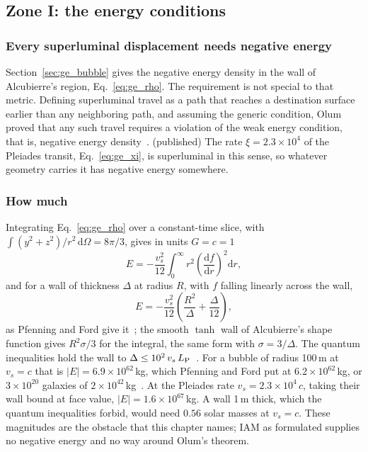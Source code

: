 \subsection{Zone I: the energy conditions}\label{sec:pr_energy}

\subsubsection{Every superluminal displacement needs negative energy}
Section~\ref{sec:ge_bubble} gives the negative energy density in the wall of Alcubierre's region, Eq.~\eqref{eq:ge_rho}. The requirement is not
special to that metric. Defining superluminal travel as a path that reaches a destination surface earlier than any neighboring path, and assuming
the generic condition, Olum proved that any such travel requires a violation of the weak energy condition, that is, negative energy
density~\cite{Olum1998}. \derived{} (published) The rate $\xi=2.3\times10^4$ of the Pleiades transit, Eq.~\eqref{eq:ge_xi}, is superluminal in this
sense, so whatever geometry carries it has negative energy somewhere. \derived

\subsubsection{How much}
Integrating Eq.~\eqref{eq:ge_rho} over a constant-time slice, with $\int(y^2+z^2)/r^2\,\mathrm d\Omega=8\pi/3$, gives in units $G=c=1$
\begin{equation}
E=-\frac{v_s^2}{12}\int_0^\infty r^2\left(\frac{\mathrm df}{\mathrm dr}\right)^2\mathrm dr ,
\label{eq:pr_Etot}
\end{equation}
\derived{} and for a wall of thickness $\Delta$ at radius $R$, with $f$ falling linearly across the wall,
\begin{equation}
E=-\frac{v_s^2}{12}\left(\frac{R^2}{\Delta}+\frac{\Delta}{12}\right) ,
\label{eq:pr_Ewall}
\end{equation}
as Pfenning and Ford give it~\cite{PfenningFord1997}; the smooth $\tanh$ wall of Alcubierre's shape function gives $R^2\sigma/3$ for the integral, the
same form with $\sigma=3/\Delta$. \derived{} The quantum inequalities hold the wall to $\Delta\le10^2\,v_s\,L_{\rm P}$~\cite{PfenningFord1997}.
For a bubble of radius 100\,m at $v_s=c$ that is $|E|=6.9\times10^{62}$\,kg, which Pfenning and Ford put at $6.2\times10^{62}$\,kg, or
$3\times10^{20}$ galaxies of $2\times10^{42}$\,kg~\cite{PfenningFord1997}. \calc{} At the Pleiades rate $v_s=2.3\times10^4\,c$, taking their wall
bound at face value, $|E|=1.6\times10^{67}$\,kg. \calc{} A wall 1\,m thick, which the quantum inequalities forbid, would need $0.56$ solar masses at
$v_s=c$. \calc{} These magnitudes are the obstacle that this chapter names; IAM as formulated supplies no negative energy and no way
around Olum's theorem. \derived

